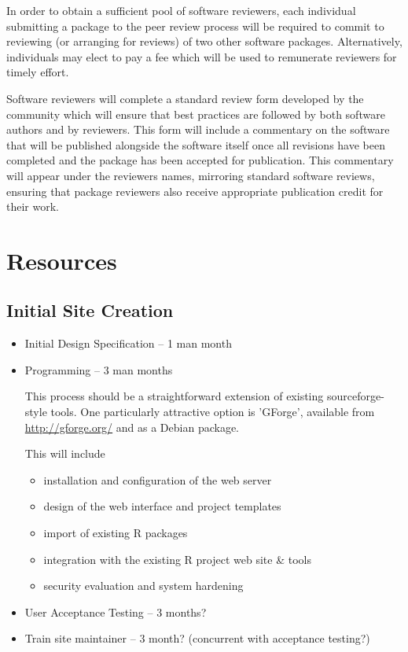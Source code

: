 \documentclass[12pt]{article}
\begin{document}
In order to obtain a sufficient pool of software reviewers, each
individual submitting a package to the peer review process will be
required to commit to reviewing (or arranging for reviews) of two
other software packages.  Alternatively, individuals may elect to
pay a fee which will be used to remunerate reviewers for timely
effort.

Software reviewers will complete a standard review form developed by
the community which will ensure that best practices are followed by
both software authors and by reviewers.  This form will include a
commentary on the software that will be published alongside the
software itself once all revisions have been completed and the
package has been accepted for publication.  This commentary will
appear under the reviewers names, mirroring standard software
reviews, ensuring that package reviewers also receive appropriate
publication credit for their work.

\section{Resources}

\subsection{Initial Site Creation}

\begin{itemize}
\item Initial Design Specification -- 1 man month

\item Programming -- 3 man months

  This process should be a straightforward extension of existing
  sourceforge-style tools.  One particularly attractive option is
  'GForge', available from \url{http://gforge.org/} and as a Debian package.

  This will include
  \begin{itemize}
  \item installation and configuration of the web server
  \item design of the web interface and project templates
  \item import of existing R packages
  \item integration with the existing R project web site \& tools
  \item security evaluation and system hardening
  \end{itemize}

\item User Acceptance Testing -- 3 months?

\item Train site maintainer -- 3 month?  (concurrent with acceptance testing?)

\end{itemize}
\end{document}
